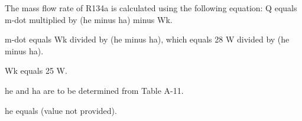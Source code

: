 The mass flow rate of R134a is calculated using the following equation:  
Q equals m-dot multiplied by (he minus ha) minus Wk.  

m-dot equals Wk divided by (he minus ha), which equals 28 W divided by (he minus ha).  

Wk equals 25 W.  

he and ha are to be determined from Table A-11.  

he equals (value not provided).